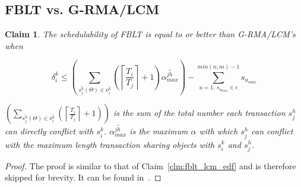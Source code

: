 \documentclass[conference]{IEEEtran}
\newtheorem{clm}{Claim}
\begin{document}
\subsection{FBLT vs. G-RMA/LCM}
\begin{clm}\label{clm:fblt_lcm_rma}
The schedulability of FBLT is equal to or better than G-RMA/LCM's when 

\[
\delta_i^k\le\left(\sum_{\bar{s_{j}^{h}}(\Theta)\in \bar{\nu_{i}^{k}}}\left(\left\lceil \frac{T_{i}}{T_{j}}\right\rceil +1\right)\bar{\alpha_{max}^{jh}}\right)-\sum_{u=1,\,s_{u_{max}}\in \epsilon}^{min(n,m)-1} s_{u_{max}}\label{eq:fblt_lcm_rma_comparison_7_mod}
\]

$\left(\sum_{\bar{s_{j}^{h}}(\Theta) \in \bar{\nu_{i}^{k}}}\left(\left\lceil \frac{T_{i}}{T_{j}}\right\rceil +1\right)\right)$ is the sum of the total number each transaction $s_j^h$ can directly conflict with $s_i^k$. $\bar{\alpha_{max}^{jh}}$ is the maximum $\alpha$ with which $s_j^h$ can conflict with the maximum length transaction sharing objects with $s_i^k$ and $s_j^h$. 

\end{clm}
%
\begin{proof}
The proof is similar to that of Claim~\ref{clm:fblt_lcm_edf} and is therefore skipped for brevity. It can be found in~\cite{stmconcurrencycontrol_techreport}.
\end{proof}
\end{document}
